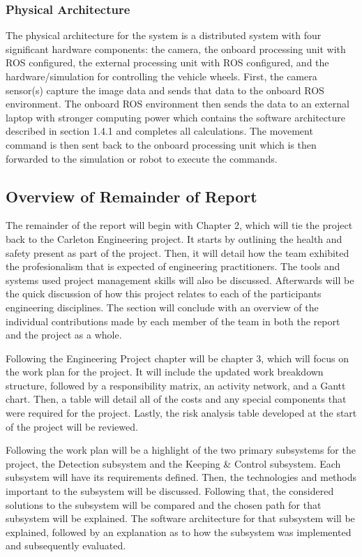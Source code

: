\documentclass[titlepage]{article}
\begin{document}
\subsubsection{Physical Architecture}

The physical architecture for the system is a distributed system with four  significant hardware components: the camera, the onboard processing unit with ROS configured, the external processing unit with ROS configured, and the hardware/simulation for controlling the vehicle wheels. First, the camera sensor(s) capture the image data and sends that data to the onboard ROS environment. The onboard ROS environment then sends the data to an external laptop with stronger computing power which contains the software architecture described in section 1.4.1 and completes all calculations. The movement command is then sent back to the onboard processing unit which is then forwarded to the simulation or robot to execute the commands.

\subsection{Overview of Remainder of Report}

The remainder of the report will begin with Chapter 2, which will tie the project back to the Carleton Engineering project. It starts by outlining the health and safety present as part of the project.  Then, it will detail how the team exhibited the profesionalism that is expected of engineering practitioners. The tools and systems used project management skills will also be discussed. Afterwards will be the quick discussion of how this project relates to each of the participants engineering disciplines. The section will conclude with an overview of the individual contributions made by each member of the team in both the report and the project as a whole.

Following the Engineering Project chapter will be chapter 3, which will focus on the work plan for the project. It will include the updated work breakdown structure, followed by a responsibility matrix, an activity network, and a Gantt chart. Then, a table will detail all of the costs and any special components that were required for the project. Lastly, the risk analysis table developed at the start of the project will be reviewed.

Following the work plan will be a highlight of the two primary subsystems for the project, the Detection subsystem and the Keeping \& Control subsystem. Each subsystem will have its requirements defined. Then, the technologies and methods important to the subsystem will be discussed. Following that, the considered solutions to the subsystem will be compared and the chosen path for that subsystem will be explained. The software architecture for that subsystem will be explained, followed by an explanation as to how the subsystem was implemented and subsequently evaluated.
\end{document}

